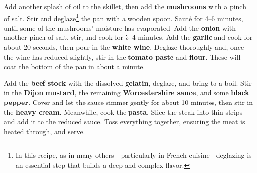 Add another splash of oil to the skillet, then add the \textbf{mushrooms} with a pinch of salt. 
Stir and deglaze\footnote{In this recipe, as in many others---particularly in French cuisine---deglazing is an essential step that builds a deep and complex flavor.} the pan with a wooden spoon.
Sauté for 4--5 minutes, until some of the mushrooms' moisture has evaporated.
Add the \textbf{onion} with another pinch of salt, stir, and cook for 3--4 minutes.
Add the \textbf{garlic} and cook for about 20 seconds, then pour in the \textbf{white wine}.
Deglaze thoroughly and, once the wine has reduced slightly, stir in the \textbf{tomato paste} and \textbf{flour}.
These will coat the bottom of the pan in about a minute.

Add the \textbf{beef stock} with the dissolved \textbf{gelatin}, deglaze, and bring to a boil. 
Stir in the \textbf{Dijon mustard}, the remaining \textbf{Worcestershire sauce}, and some \textbf{black pepper}.
Cover and let the sauce simmer gently for about 10 minutes, then stir in the \textbf{heavy cream}.
Meanwhile, cook the \textbf{pasta}. 
Slice the steak into thin strips and add it to the reduced sauce.
Toss everything together, ensuring the meat is heated through, and serve. 


\begin{recipeblock}
	
\end{recipeblock}
